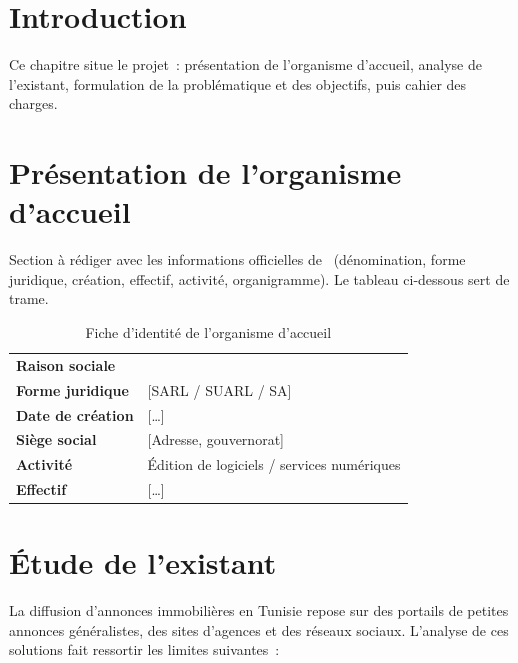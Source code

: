 
\section*{Introduction}
Ce chapitre situe le projet~: présentation de l'organisme d'accueil, analyse de
l'existant, formulation de la problématique et des objectifs, puis cahier des
charges.

\section{Présentation de l'organisme d'accueil}
\label{sec:organisme}

\begin{tcolorbox}[colback=codebg,colframe=subtitle,title=À compléter]
Section à rédiger avec les informations officielles de \rapportEntreprise\
(dénomination, forme juridique, création, effectif, activité, organigramme).
Le tableau ci-dessous sert de trame.
\end{tcolorbox}

\begin{table}[H]
\centering
\renewcommand{\arraystretch}{1.25}
\begin{tabularx}{\linewidth}{>{\bfseries}p{4cm} X}
\toprule
Raison sociale     & \rapportEntreprise \\
Forme juridique    & [SARL / SUARL / SA] \\
Date de création   & [\ldots] \\
Siège social       & [Adresse, gouvernorat] \\
Activité           & Édition de logiciels / services numériques \\
Effectif           & [\ldots] \\
\bottomrule
\end{tabularx}
\caption{Fiche d'identité de l'organisme d'accueil}
\label{tab:fiche-entreprise}
\end{table}

\section{Étude de l'existant}
\label{sec:existant}

La diffusion d'annonces immobilières en Tunisie repose sur des portails de
petites annonces généralistes, des sites d'agences et des réseaux sociaux.
L'analyse de ces solutions fait ressortir les limites suivantes~:

